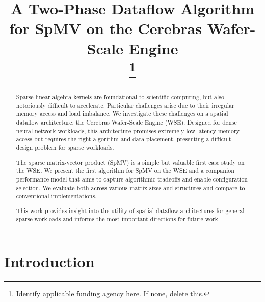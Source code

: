 \documentclass[conference]{IEEEtran}
\begin{document}
\title{A Two-Phase Dataflow Algorithm for SpMV on the Cerebras Wafer-Scale Engine\\

\thanks{Identify applicable funding agency here. If none, delete this.}
}

\author{
}


\maketitle

\begin{abstract}
Sparse linear algebra kernels are foundational to scientific computing, but also notoriously difficult to accelerate. Particular challenges arise due to their irregular memory access and load imbalance. We investigate these challenges on a spatial dataflow architecture: the Cerebras Wafer-Scale Engine (WSE). Designed for dense neural network workloads, this architecture promises extremely low latency memory access but requires the right algorithm and data placement, presenting a difficult design problem for sparse workloads.

The sparse matrix-vector product (SpMV) is a simple but valuable first case study on the WSE. We present the first algorithm for SpMV on the WSE and a companion performance model that aims to capture algorithmic tradeoffs and enable configuration selection. We evaluate both across various matrix sizes and structures and compare to conventional implementations.

This work provides insight into the utility of spatial dataflow architectures for general sparse workloads and informs the most important directions for future work.
\end{abstract}

\begin{IEEEkeywords}

\end{IEEEkeywords}

\section{Introduction}
\end{document}
